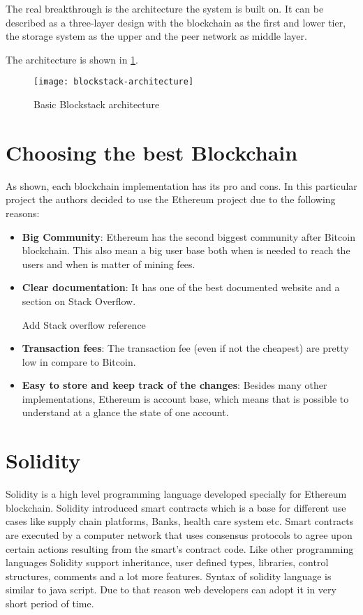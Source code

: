 The real breakthrough is the architecture the system is built on. It can be described as a three-layer design with the blockchain as the first and lower tier, the storage system as the upper and the peer network as middle layer.

The architecture is shown in \ref{fig1}.
\begin{figure}[h]
	\centering
  \texttt{[image: blockstack-architecture]}
	\caption{Basic Blockstack architecture}
	\label{fig1}
\end{figure}

\section{Choosing the best Blockchain}
As shown, each blockchain implementation has its pro and cons. In this particular project the authors decided to use the Ethereum project due to the following reasons:
\begin{itemize}
	\item \textbf{Big Community}: Ethereum has the second biggest community after Bitcoin blockchain. This also mean a big user base both when is needed to reach the users and when is matter of mining fees.
	\item \textbf{Clear documentation}: It has one of the best documented website and a section on Stack Overflow.
	\begin{notation}
		Add Stack overflow reference
	\end{notation}
	\item \textbf{Transaction fees}: The transaction fee (even if not the cheapest) are pretty low in compare to Bitcoin.
	\item \textbf{Easy to store and keep track of the changes}: Besides many other implementations, Ethereum is account base, which means that is possible to understand at a glance the state of one account.
\end{itemize}

\section{Solidity}
Solidity is a high level programming language developed specially for Ethereum blockchain. Solidity introduced smart contracts which is a base for different use cases like supply chain platforms, Banks, health care system etc. Smart contracts are executed by a computer network that uses consensus protocols to agree upon certain actions resulting from the smart’s contract code. Like other programming languages Solidity support inheritance, user defined types, libraries, control structures, comments and a lot more features. Syntax of solidity language is similar to java script. Due to that reason web developers can adopt it in very short period of time.

